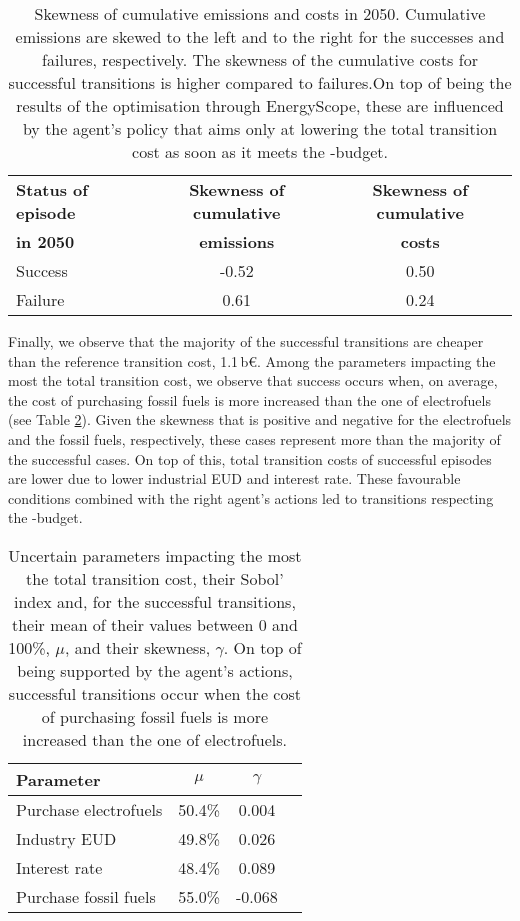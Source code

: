 \begin{table}[htbp!]
\caption{Skewness of cumulative emissions and costs in 2050. Cumulative emissions are skewed to the left and to the right for the successes and failures, respectively. The skewness of the cumulative costs for successful transitions is higher compared to failures.On top of being the results of the optimisation through EnergyScope, these are influenced by the agent's policy that aims only at lowering the total transition cost as soon as it meets the -budget.}
\label{tab:skewness_gwp_cost}
\centering
\begin{tabular}{l c c}
\toprule
\textbf{Status of episode}  & \textbf{Skewness of cumulative} & \textbf{Skewness of cumulative} \\
\textbf{in 2050}  & \textbf{emissions} & \textbf{costs} \\	
\midrule
Success & -0.52 & 0.50 \\
Failure & 0.61 & 0.24 \\
\bottomrule							

\end{tabular}
\end{table}

Finally, we observe that the majority of the successful transitions are cheaper than the reference transition cost, 1.1\,b€. Among the parameters impacting the most the total transition cost, we observe that success occurs when, on average,  the cost of purchasing fossil fuels is more increased than the one of electrofuels (see Table \ref{tab:param_RL}).  Given the skewness that is positive and negative for the electrofuels and the fossil fuels, respectively, these cases represent more than the majority of the successful cases. On top of this, total transition costs of successful episodes are lower due to lower industrial \gls{EUD} and interest rate. These favourable conditions combined with the right agent's actions led to transitions respecting the -budget.

\begin{table}[htbp!]
\caption{Uncertain parameters impacting the most the total transition cost, their Sobol' index and, for the successful transitions, their mean of their values between 0 and 100\%, $\mu$, and their skewness, $\gamma$. On top of being supported by the agent's actions, successful transitions occur when the cost of purchasing fossil fuels is more increased than the one of electrofuels.}
\label{tab:param_RL}
\centering
\begin{tabular}{l c c c}
\toprule
\textbf{Parameter}  & \textbf{$\mu$} & \textbf{$\gamma$}  \\	
\midrule
Purchase electrofuels & 50.4\% & 0.004  \\
Industry EUD & 49.8\% & 0.026 \\
Interest rate & 48.4\% & 0.089\\
Purchase fossil fuels  & 55.0\% & -0.068\\
\bottomrule							

\end{tabular}
\end{table}

